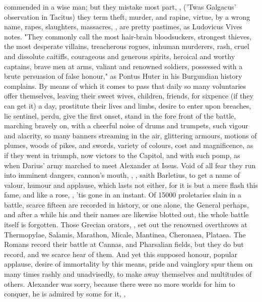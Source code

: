 commended in a wise man; but they mistake most part, , \etc{} ('Twas Galgacus' observation
in Tacitus) they term theft, murder, and rapine, virtue, by a wrong name,
rapes, slaughters, massacres, \etc{} , are pretty pastimes,
as Ludovicus Vives notes. "They commonly call the most
hair-brain bloodsuckers, strongest thieves, the most desperate villains,
treacherous rogues, inhuman murderers, rash, cruel and dissolute caitiffs,
courageous and generous spirits, heroical and worthy captains,
brave men at arms, valiant and renowned soldiers, possessed
with a brute persuasion of false honour," as Pontus Huter in his Burgundian
history complains. By means of which it comes to pass that daily so many
voluntaries offer themselves, leaving their sweet wives, children, friends, for
sixpence (if they can get it) a day, prostitute their lives and limbs, desire
to enter upon breaches, lie sentinel, perdu, give the first onset, stand in the
fore front of the battle, marching bravely on, with a cheerful noise of drums
and trumpets, such vigour and alacrity, so many banners streaming in the air,
glittering armours, motions of plumes, woods of pikes, and swords, variety of
colours, cost and magnificence, as if they went in triumph, now victors to the
Capitol, and with such pomp, as when Darius' army marched to meet Alexander at
Issus. Void of all fear they run into imminent dangers, cannon's mouth, \etc{},
, saith
Barletius, to get a name of valour, humour and applause,
which lasts not either, for it is but a mere flash this fame, and like a rose,
, 'tis gone in an instant. Of 15\thinspace{}000
proletaries slain in a battle, scarce fifteen are recorded in history, or one
alone, the General perhaps, and after a while his and their names are likewise
blotted out, the whole battle itself is forgotten. Those Grecian orators,
, set out the renowned overthrows at
Thermopylae, Salamis, Marathon, Micale, Mantinea, Cheronaea, Plataea. The
Romans record their battle at Cannas, and Pharsalian fields, but they do but
record, and we scarce hear of them. And yet this supposed honour, popular
applause, desire of immortality by this means, pride and vainglory spur them on
many times rashly and unadvisedly, to make away themselves and multitudes of
others. Alexander was sorry, because there were no more worlds for him to
conquer, he is admired by some for it, ,
